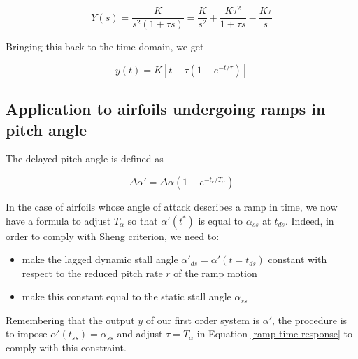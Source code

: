 \begin{equation}
Y(s) = \frac{K}{s^2(1+\tau s)} = \frac{K}{s^2} + \frac{K \tau^2}{1+\tau s} - \frac{K \tau}{s}
\end{equation}

Bringing this back to the time domain, we get 

\begin{equation}
y(t) = K \left[ t - \tau(1-e^{-t/\tau})\right]
\label{ramp time response}
\end{equation}

\subsection{Application to airfoils undergoing ramps in pitch angle}

The delayed pitch angle is defined as 

\begin{equation}
\Delta \alpha' = \Delta \alpha (1-e^{-t_c/T_\alpha})
\end{equation}

In the case of airfoils whose angle of attack describes a ramp in time, we now have a formula to adjust $T_\alpha$ so that $\alpha'(t^*)$ is equal to $\alpha_{ss}$ at $t_{ds}$. Indeed, in order to comply with Sheng criterion, we need to:

\begin{itemize}
\item make the lagged dynamic stall angle $\alpha'_{ds} = \alpha'(t=t_{ds})$ constant with respect to the reduced pitch rate $r$ of the ramp motion
\item make this constant equal to the static stall angle $\alpha_{ss}$
\end{itemize}


\noindent Remembering that the output $y$ of our first order system is $\alpha'$, the procedure is to impose $\alpha'(t_{ss}) = \alpha_{ss}$ and adjust $\tau = T_\alpha$ in Equation \eqref{ramp time response} to comply with this constraint.